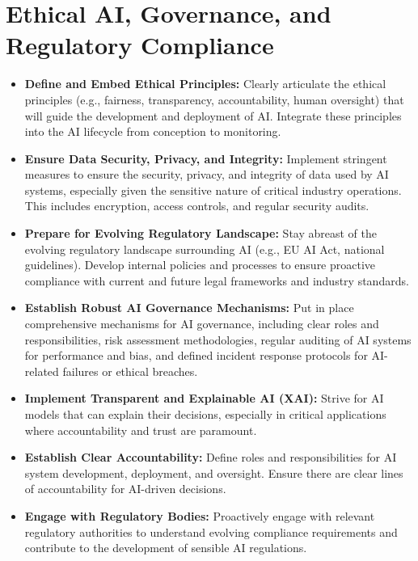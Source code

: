 \section*{Ethical AI, Governance, and Regulatory Compliance}
\begin{itemize}
    \item \textbf{Define and Embed Ethical Principles:} Clearly articulate the ethical principles (e.g., fairness, transparency, accountability, human oversight) that will guide the development and deployment of AI. Integrate these principles into the AI lifecycle from conception to monitoring.
    \item \textbf{Ensure Data Security, Privacy, and Integrity:} Implement stringent measures to ensure the security, privacy, and integrity of data used by AI systems, especially given the sensitive nature of critical industry operations. This includes encryption, access controls, and regular security audits.
    \item \textbf{Prepare for Evolving Regulatory Landscape:} Stay abreast of the evolving regulatory landscape surrounding AI (e.g., EU AI Act, national guidelines). Develop internal policies and processes to ensure proactive compliance with current and future legal frameworks and industry standards.
    \item \textbf{Establish Robust AI Governance Mechanisms:} Put in place comprehensive mechanisms for AI governance, including clear roles and responsibilities, risk assessment methodologies, regular auditing of AI systems for performance and bias, and defined incident response protocols for AI-related failures or ethical breaches.
    \item \textbf{Implement Transparent and Explainable AI (XAI):} Strive for AI models that can explain their decisions, especially in critical applications where accountability and trust are paramount.
    \item \textbf{Establish Clear Accountability:} Define roles and responsibilities for AI system development, deployment, and oversight. Ensure there are clear lines of accountability for AI-driven decisions.
    \item \textbf{Engage with Regulatory Bodies:} Proactively engage with relevant regulatory authorities to understand evolving compliance requirements and contribute to the development of sensible AI regulations.
\end{itemize}

